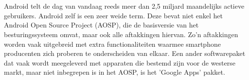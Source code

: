 
%
%

%



\chapter*{}

Android telt de dag van vandaag reeds meer dan 2,5 miljard maandelijks actieve gebruikers. Android zelf is een zeer weide term. Deze bevat niet enkel het Android Open Source Project (AOSP), die de basisversie van het besturingssysteem omvat, maar ook alle aftakkingen hiervan. Zo'n aftakkingen worden vaak uitgebreid met extra functionaliteiten waarmee smartphone producenten zich proberen te onderscheiden van elkaar. Een ander softwarepaket dat vaak wordt meegeleverd met apparaten die bestemd zijn voor de westerse markt, maar niet inbegrepen is in het AOSP, is het 'Google Apps' pakket.

